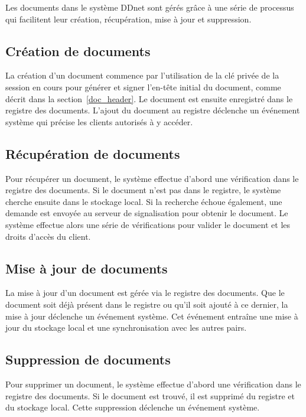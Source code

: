 Les documents dans le système DDnet sont gérés grâce à une série de processus qui facilitent leur création, récupération, mise à jour et suppression.

\subsection{Création de documents}

La création d'un document commence par l'utilisation de la clé privée de la session en cours pour générer et signer l'en-tête initial du document, comme décrit dans la section~\ref{doc_header}. Le document est ensuite enregistré dans le registre des documents. L'ajout du document au registre déclenche un événement système qui précise les clients autorisés à y accéder.

\subsection{Récupération de documents}

Pour récupérer un document, le système effectue d'abord une vérification dans le registre des documents. Si le document n'est pas dans le registre, le système cherche ensuite dans le stockage local. Si la recherche échoue également, une demande est envoyée au serveur de signalisation pour obtenir le document. Le système effectue alors une série de vérifications pour valider le document et les droits d'accès du client.

\subsection{Mise à jour de documents}

La mise à jour d'un document est gérée via le registre des documents. Que le document soit déjà présent dans le registre ou qu'il soit ajouté à ce dernier, la mise à jour déclenche un événement système. Cet événement entraîne une mise à jour du stockage local et une synchronisation avec les autres pairs.

\subsection{Suppression de documents}

Pour supprimer un document, le système effectue d'abord une vérification dans le registre des documents. Si le document est trouvé, il est supprimé du registre et du stockage local. Cette suppression déclenche un événement système.

